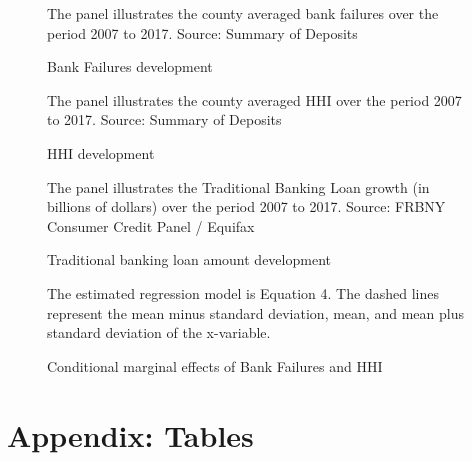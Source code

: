 \documentclass[11pt, a4paper, leqno]{article}
\begin{document}
\begin{figure}[!h!]
\caption{Bank Failures development}\label{fig:failure}
\vspace{0.25cm}
\hspace{0.5cm} \parbox{15cm}{\scriptsize The panel illustrates the county averaged bank failures over the period 2007 to 2017. Source: Summary of Deposits}
\end{figure}

\begin{figure}[!h!]
\caption{HHI development}\label{fig:HHI}
\vspace{0.25cm}
\hspace{0.5cm} \parbox{15cm}{\scriptsize The panel illustrates the county averaged HHI over the period 2007 to 2017. Source: Summary of Deposits}
\end{figure}

\begin{figure}[!h!]
\caption{Traditional banking loan amount development}\label{fig:TB}
\vspace{0.25cm}
\hspace{0.5cm} \parbox{15cm}{\scriptsize The panel illustrates the Traditional Banking Loan growth (in billions of dollars) over the period 2007 to 2017. Source: FRBNY Consumer Credit Panel / Equifax}
\end{figure}
\begin{figure}[!h!]
\centering
\caption{Conditional marginal effects of Bank Failures and HHI}\label{fig:Margin}
\vspace{0.25cm}
\hspace{0.5cm} \parbox{15cm}{\scriptsize The estimated regression model is Equation 4. The dashed lines represent the mean minus standard
deviation, mean, and mean plus standard deviation of the x-variable.}
\end{figure}



\clearpage
\section*{Appendix: Tables}
\end{document}
